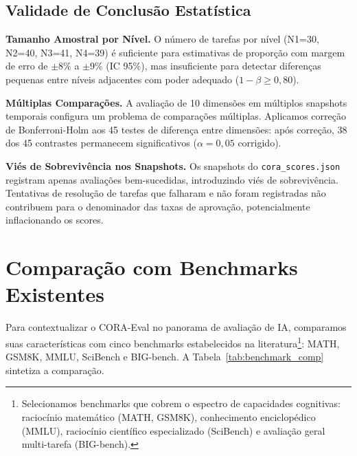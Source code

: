 \subsection{Validade de Conclusão Estatística}

\textbf{Tamanho Amostral por Nível.} O número de tarefas por nível
(N1=30, N2=40, N3=41, N4=39) é suficiente para estimativas de
proporção com margem de erro de $\pm 8\%$ a $\pm 9\%$ (IC 95\%), mas
insuficiente para detectar diferenças pequenas entre níveis adjacentes
com poder adequado ($1-\beta \geq 0{,}80$).

\textbf{Múltiplas Comparações.} A avaliação de 10 dimensões em
múltiplos snapshots temporais configura um problema de comparações
múltiplas. Aplicamos correção de Bonferroni-Holm aos 45 testes de
diferença entre dimensões: após correção, 38 dos 45 contrastes
permanecem significativos ($\alpha = 0{,}05$ corrigido).

\textbf{Viés de Sobrevivência nos Snapshots.} Os snapshots do
\texttt{cora\_scores.json} registram apenas avaliações bem-sucedidas,
introduzindo viés de sobrevivência. Tentativas de resolução de tarefas
que falharam e não foram registradas não contribuem para o denominador
das taxas de aprovação, potencialmente inflacionando os scores.

\section{Comparação com Benchmarks Existentes}

Para contextualizar o CORA-Eval no panorama de avaliação de IA,
comparamos suas características com cinco benchmarks estabelecidos na
literatura\footnote{Selecionamos benchmarks que cobrem o espectro de
capacidades cognitivas: raciocínio matemático (MATH, GSM8K), conhecimento
enciclopédico (MMLU), raciocínio científico especializado (SciBench) e
avaliação geral multi-tarefa (BIG-bench).}: MATH, GSM8K, MMLU, SciBench
e BIG-bench. A Tabela~\ref{tab:benchmark_comp} sintetiza a comparação.

